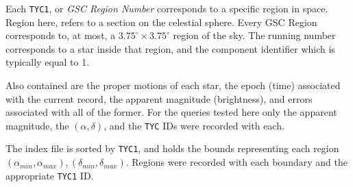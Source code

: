 Each \texttt{TYC1}, or \textit{GSC Region Number} corresponds to a specific region in space.
Region here, refers to a section on the celestial sphere.
Every GSC Region corresponds to, at most, a $3.75^\circ \times 3.75^\circ$ region of the sky.
The running number corresponds to a star inside that region, and the component identifier which is typically equal to 1.

Also contained are the proper motions of each star, the epoch (time) associated with the current record, the apparent
magnitude (brightness), and errors associated with all of the former.
For the queries tested here only the apparent magnitude, the $(\alpha, \delta)$, and the \texttt{TYC} IDs were recorded
with each.

The index file is sorted by \texttt{TYC1}, and holds the bounds representing each region $\left(\alpha_{min},
\alpha_{max}\right), \left(\delta_{min}, \delta_{max}\right)$.
Regions were recorded with each boundary and the appropriate \texttt{TYC1} ID\@.

